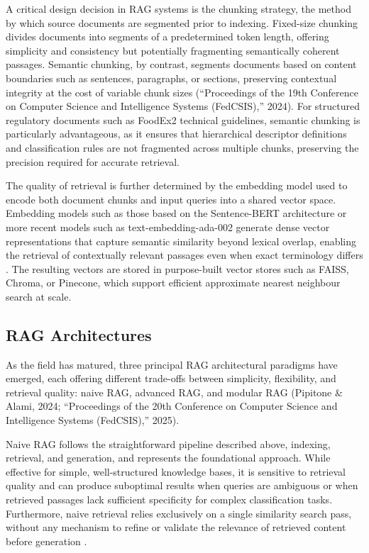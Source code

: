 A critical design decision in RAG systems is the chunking strategy, the method by which source documents are segmented prior to indexing. Fixed-size chunking divides documents into segments of a predetermined token length, offering simplicity and consistency but potentially fragmenting semantically coherent passages. Semantic chunking, by contrast, segments documents based on content boundaries such as sentences, paragraphs, or sections, preserving contextual integrity at the cost of variable chunk sizes (``Proceedings of the 19th Conference on Computer Science and Intelligence Systems (FedCSIS),'' 2024). For structured regulatory documents such as FoodEx2 technical guidelines, semantic chunking is particularly advantageous, as it ensures that hierarchical descriptor definitions and classification rules are not fragmented across multiple chunks, preserving the precision required for accurate retrieval.

The quality of retrieval is further determined by the embedding model used to encode both document chunks and input queries into a shared vector space. Embedding models such as those based on the Sentence-BERT architecture or more recent models such as text-embedding-ada-002 generate dense vector representations that capture semantic similarity beyond lexical overlap, enabling the retrieval of contextually relevant passages even when exact terminology differs \parencite{maria_flavia_lovin_0fb6ab18}. The resulting vectors are stored in purpose-built vector stores such as FAISS, Chroma, or Pinecone, which support efficient approximate nearest neighbour search at scale.

\hypertarget{rag-architectures}{%
\subsection{RAG Architectures}\label{rag-architectures}}

As the field has matured, three principal RAG architectural paradigms have emerged, each offering different trade-offs between simplicity, flexibility, and retrieval quality: naive RAG, advanced RAG, and modular RAG (Pipitone \& Alami, 2024; ``Proceedings of the 20th Conference on Computer Science and Intelligence Systems (FedCSIS),'' 2025).

Naive RAG follows the straightforward pipeline described above, indexing, retrieval, and generation, and represents the foundational approach. While effective for simple, well-structured knowledge bases, it is sensitive to retrieval quality and can produce suboptimal results when queries are ambiguous or when retrieved passages lack sufficient specificity for complex classification tasks. Furthermore, naive retrieval relies exclusively on a single similarity search pass, without any mechanism to refine or validate the relevance of retrieved content before generation \parencite{yuhe_ke_37be3f59}.

